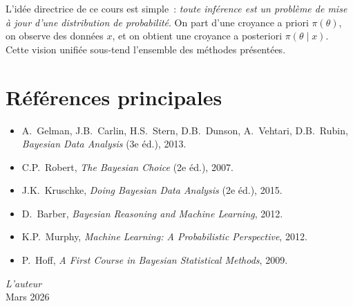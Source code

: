 \begin{intuition}[title=\textbf{Fil conducteur}]
L'id\'ee directrice de ce cours est simple~: \textit{toute inf\'erence
est un probl\`eme de mise \`a jour d'une distribution de probabilit\'e}.
On part d'une croyance a priori $\pi(\theta)$, on observe des donn\'ees
$x$, et on obtient une croyance a posteriori $\pi(\theta \mid x)$.
Cette vision unifi\'ee sous-tend l'ensemble des m\'ethodes pr\'esent\'ees.
\end{intuition}

\section*{R\'ef\'erences principales}

\begin{itemize}
  \item A.~Gelman, J.B.~Carlin, H.S.~Stern, D.B.~Dunson, A.~Vehtari,
        D.B.~Rubin, \textit{Bayesian Data Analysis} (3e \'ed.), 2013.
  \item C.P.~Robert, \textit{The Bayesian Choice} (2e \'ed.), 2007.
  \item J.K.~Kruschke, \textit{Doing Bayesian Data Analysis} (2e \'ed.),
        2015.
  \item D.~Barber, \textit{Bayesian Reasoning and Machine Learning}, 2012.
  \item K.P.~Murphy, \textit{Machine Learning: A Probabilistic Perspective},
        2012.
  \item P.~Hoff, \textit{A First Course in Bayesian Statistical Methods},
        2009.
\end{itemize}

\bigskip
\begin{flushright}
\textit{L'auteur} \\
Mars 2026
\end{flushright}
